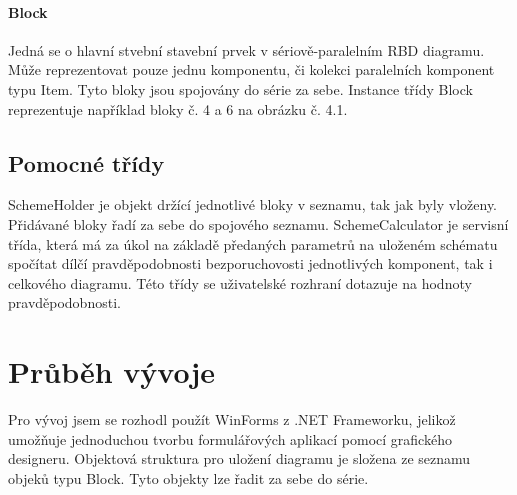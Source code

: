 \documentclass[FM,RP]{tulthesis}
\begin{document}
        \subsubsection*{Block}
            Jedná se o hlavní stvební stavební prvek v sériově-paralelním RBD diagramu.
            Může reprezentovat pouze jednu komponentu, či kolekci paralelních komponent typu Item. 
            Tyto bloky jsou spojovány do série za sebe.
            Instance třídy Block reprezentuje například bloky č. 4 a 6 na obrázku č. 4.1.
    
    \section*{Pomocné třídy}
        SchemeHolder je objekt držící jednotlivé bloky v seznamu, tak jak byly vloženy. Přidávané bloky řadí za sebe do spojového seznamu.
        SchemeCalculator je servisní třída, která má za úkol na základě předaných parametrů na uloženém schématu spočítat dílčí pravděpodobnosti bezporuchovosti jednotlivých komponent,
        tak i celkového diagramu. Této třídy se uživatelské rozhraní dotazuje na hodnoty pravděpodobnosti. 

\chapter{Průběh vývoje}
    Pro vývoj jsem se rozhodl použít WinForms z .NET Frameworku, jelikož umožňuje jednoduchou tvorbu formulářových aplikací pomocí grafického designeru.
    Objektová struktura pro uložení diagramu je složena ze seznamu objeků typu Block. Tyto objekty lze řadit za sebe do série.
\end{document}
